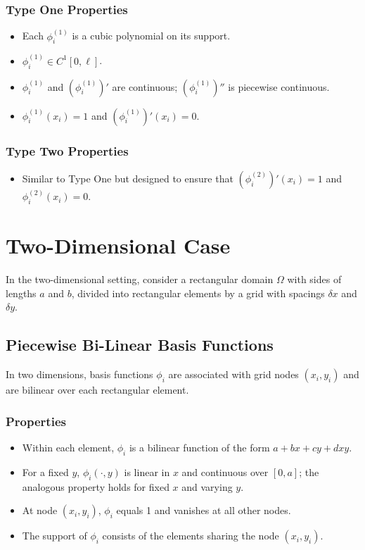 \documentclass[../../main.tex]{subfiles}
\begin{document}
\subsubsection*{Type One Properties}
\begin{itemize}
	\item Each \(\phi^{(1)}_i\) is a cubic polynomial on its support.
	\item \(\phi^{(1)}_i \in C^1[0,\ell]\).
	\item \(\phi^{(1)}_i\) and \((\phi^{(1)}_i)'\) are continuous; \((\phi^{(1)}_i)''\) is piecewise continuous.
	\item \(\phi^{(1)}_i(x_i) = 1\) and \((\phi^{(1)}_i)'(x_i) = 0\).
\end{itemize}

\subsubsection*{Type Two Properties}
\begin{itemize}
	\item Similar to Type One but designed to ensure that \((\phi^{(2)}_i)'(x_i) = 1\) and \(\phi^{(2)}_i(x_i) = 0\).
\end{itemize}

\section*{Two-Dimensional Case}
In the two-dimensional setting, consider a rectangular domain \(\Omega\) with sides of lengths \(a\) and \(b\), divided into rectangular elements by a grid with spacings \(\delta x\) and \(\delta y\).

\subsection*{Piecewise Bi-Linear Basis Functions}
In two dimensions, basis functions \(\phi_i\) are associated with grid nodes \((x_i, y_i)\) and are bilinear over each rectangular element.

\subsubsection*{Properties}
\begin{itemize}
	\item Within each element, \(\phi_i\) is a bilinear function of the form \(a + bx + cy + dxy\).
	\item For a fixed \(y\), \(\phi_i(\cdot, y)\) is linear in \(x\) and continuous over \([0, a]\); the analogous property holds for fixed \(x\) and varying \(y\).
	\item At node \((x_i, y_i)\), \(\phi_i\) equals 1 and vanishes at all other nodes.
	\item The support of \(\phi_i\) consists of the elements sharing the node \((x_i, y_i)\).
\end{itemize}
\end{document}
